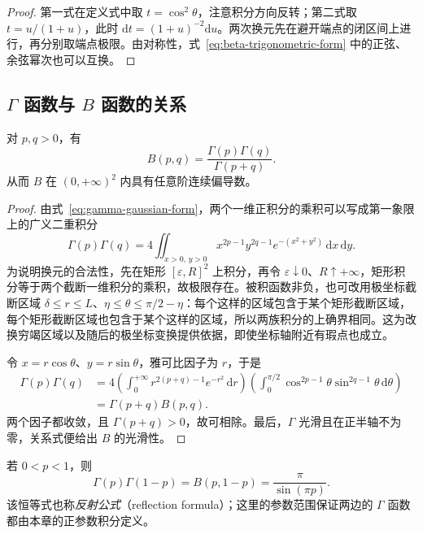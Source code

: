 \begin{proof}
第一式在定义式中取 $t=\cos^2\theta$，注意积分方向反转；第二式取 $t=u/(1+u)$，此时 $\mathrm{d}t=(1+u)^{-2}\mathrm{d}u$。两次换元先在避开端点的闭区间上进行，再分别取端点极限。由对称性，式~\eqref{eq:beta-trigonometric-form} 中的正弦、余弦幂次也可以互换。
\end{proof}

\subsection{\texorpdfstring{$\Gamma$}{Gamma} 函数与 \texorpdfstring{$B$}{B} 函数的关系}
\label{subsec:relation-between-gamma-and-beta-functions}

\begin{theorem}[贝塔--伽马关系]
\label{thm:beta-gamma-relation}
对 $p,q>0$，有
\begin{equation}
    B(p,q)=\frac{\Gamma(p)\Gamma(q)}{\Gamma(p+q)}.
    \label{eq:beta-gamma-relation}
\end{equation}
从而 $B$ 在 $(0,+\infty)^2$ 内具有任意阶连续偏导数。
\end{theorem}

\begin{proof}
由式~\eqref{eq:gamma-gaussian-form}，两个一维正积分的乘积可以写成第一象限上的广义二重积分
\[
    \Gamma(p)\Gamma(q)
    =4\iint_{x>0,\,y>0}x^{2p-1}y^{2q-1}e^{-(x^2+y^2)}
       \,\mathrm{d}x\,\mathrm{d}y.
\]
为说明换元的合法性，先在矩形 $[\varepsilon,R]^2$ 上积分，再令 $\varepsilon\downarrow0$、$R\uparrow+\infty$，矩形积分等于两个截断一维积分的乘积，故极限存在。被积函数非负，也可改用极坐标截断区域 $\delta\leq r\leq L$、$\eta\leq\theta\leq\pi/2-\eta$：每个这样的区域包含于某个矩形截断区域，每个矩形截断区域也包含于某个这样的区域，所以两族积分的上确界相同。这为改换穷竭区域以及随后的极坐标变换提供依据，即使坐标轴附近有瑕点也成立。

令 $x=r\cos\theta$、$y=r\sin\theta$，雅可比因子为 $r$，于是
\begin{align*}
    \Gamma(p)\Gamma(q)
    &=4\left(\int_0^{+\infty}r^{2(p+q)-1}e^{-r^2}\,\mathrm{d}r\right)
       \left(\int_0^{\pi/2}\cos^{2p-1}\theta\sin^{2q-1}\theta
          \,\mathrm{d}\theta\right)\\
    &=\Gamma(p+q)B(p,q).
\end{align*}
两个因子都收敛，且 $\Gamma(p+q)>0$，故可相除。最后，$\Gamma$ 光滑且在正半轴不为零，关系式便给出 $B$ 的光滑性。
\end{proof}

\begin{theorem}[余元公式]
\label{thm:gamma-reflection-formula}
若 $0<p<1$，则
\begin{equation}
    \Gamma(p)\Gamma(1-p)=B(p,1-p)=\frac{\pi}{\sin(\pi p)}.
    \label{eq:gamma-reflection-formula}
\end{equation}
该恒等式也称\emph{反射公式}（reflection formula）；这里的参数范围保证两边的 $\Gamma$ 函数都由本章的正参数积分定义。
\end{theorem}

